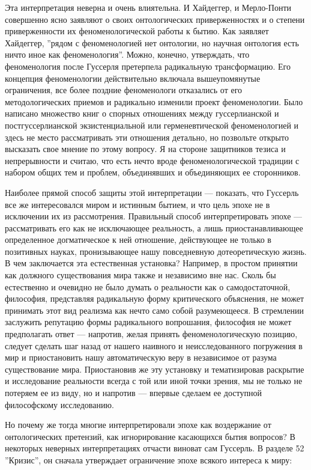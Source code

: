 \documentclass[11pt]{book}
\begin{document}
Эта интерпретация неверна и очень влиятельна. И Хайдеггер, и Мерло-Понти совершенно ясно заявляют о своих онтологических приверженностях и о степени приверженности их феноменологической работы к бытию. Как заявляет Хайдеггер, ''рядом с феноменологией нет онтологии, но научная онтология есть ничто иное как феноменология''. Можно, конечно, утверждать, что феноменология после Гуссерля претерпела радикальную трансформацию. Его концепция феноменологии действительно включала вышеупомянутые ограничения, все более поздние феноменологи отказались от его методологических приемов и радикально изменили проект феноменологии. Было написано множество книг о спорных отношениях между гуссерлианской и постгуссерлианской экзистенциальной или герменевтической феноменологией и здесь не место рассматривать эти отношения детально, но позвольте открыто высказать свое мнение по этому вопросу. Я на стороне защитников тезиса и непрерывности и считаю, что есть нечто вроде феноменологической традиции с набором общих тем и проблем, объединявших и объединяющих ее сторонников.

Наиболее прямой способ защиты этой интерпретации --- показать, что Гуссерль все же интересовался миром и истинным бытием, и что цель эпохе не в исключении их из рассмотрения. Правильный способ интерпретировать эпохе --- рассматривать его как не исключающее реальность, а лишь приостанавливающее определенное догматическое к ней отношение, действующее не только в позитивных науках, пронизывающее нашу повседневную дотеоретическую жизнь. В чем заключается эта естественная установка? Например, в простом принятии как должного существования мира также и независимо вне нас. Сколь бы естественно и очевидно не было думать о реальности как о самодостаточной, философия, представляя радикальную форму критического объяснения, не может принимать этот вид реализма как нечто само собой разумеющееся. В стремлении заслужить репутацию формы радикального вопрошания, философия не может предполагать ответ --- напротив, желая принять феноменологическую позицию, следует сделать шаг назад от нашего наивного и неисследованного погружения в мир и приостановить нашу автоматическую веру в независимое от разума существование мира. Приостановив же эту установку и тематизировав раскрытие и исследование реальности всегда с той или иной точки зрения, мы не только не потеряем ее из виду, но и напротив --- впервые сделаем ее доступной философскому исследованию.

Но почему же тогда многие интерпретировали эпохе как воздержание от онтологических претензий, как игнорирование касающихся бытия вопросов? В некоторых неверных интерпретациях отчасти виноват сам Гуссерль. В разделе 52 ''Кризис'', он сначала утверждает ограничение эпохе всякого интереса к миру:
\end{document}
